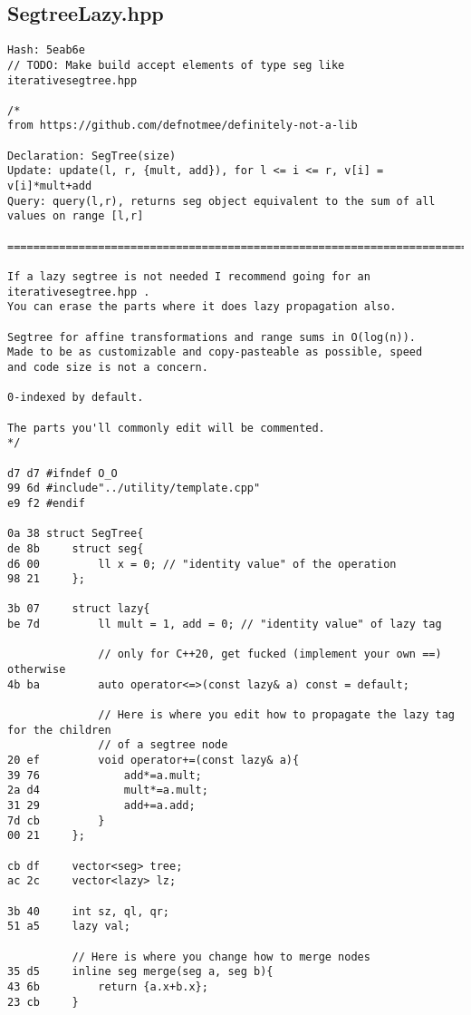 \documentclass[11pt, a4paper, twoside]{article}
\begin{document}
\subsection{SegtreeLazy.hpp}
\begin{lstlisting}
Hash: 5eab6e
// TODO: Make build accept elements of type seg like iterativesegtree.hpp

/*
from https://github.com/defnotmee/definitely-not-a-lib

Declaration: SegTree(size)
Update: update(l, r, {mult, add}), for l <= i <= r, v[i] = v[i]*mult+add
Query: query(l,r), returns seg object equivalent to the sum of all values on range [l,r]

=============================================================================

If a lazy segtree is not needed I recommend going for an iterativesegtree.hpp .
You can erase the parts where it does lazy propagation also.

Segtree for affine transformations and range sums in O(log(n)).
Made to be as customizable and copy-pasteable as possible, speed 
and code size is not a concern. 

0-indexed by default.

The parts you'll commonly edit will be commented.
*/

d7 d7 #ifndef O_O
99 6d #include"../utility/template.cpp"
e9 f2 #endif

0a 38 struct SegTree{
de 8b     struct seg{
d6 00         ll x = 0; // "identity value" of the operation
98 21     };
      
3b 07     struct lazy{
be 7d         ll mult = 1, add = 0; // "identity value" of lazy tag
      
              // only for C++20, get fucked (implement your own ==) otherwise
4b ba         auto operator<=>(const lazy& a) const = default;
      
              // Here is where you edit how to propagate the lazy tag for the children
              // of a segtree node
20 ef         void operator+=(const lazy& a){
39 76             add*=a.mult;
2a d4             mult*=a.mult;
31 29             add+=a.add;
7d cb         }
00 21     };
      
cb df     vector<seg> tree;
ac 2c     vector<lazy> lz;
      
3b 40     int sz, ql, qr;
51 a5     lazy val;
      
          // Here is where you change how to merge nodes
35 d5     inline seg merge(seg a, seg b){
43 6b         return {a.x+b.x};
23 cb     }
      

\end{lstlisting}
\end{document}
